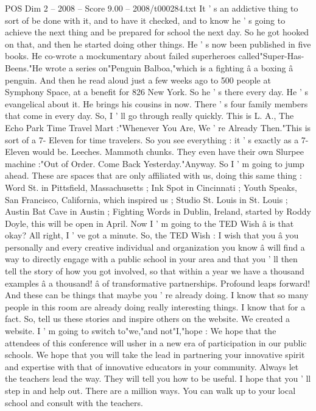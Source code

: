 \begin{textsample}{POS Dim 2 – 2008 – Score 9.00 – 2008/t000284.txt}
It ' s an addictive thing to sort of be done with it, and to have it checked, and to know he ' s going to achieve the next thing and be prepared for school the next day.
So he got hooked on that, and then he started doing other things.
He ' s now been published in five books.
He co-wrote a mockumentary about failed superheroes called"Super-Has-Beens."He wrote a series on"Penguin Balboa,"which is a fighting â a boxing â penguin.
And then he read aloud just a few weeks ago to 500 people at Symphony Space, at a benefit for 826 New York.
So he ' s there every day.
He ' s evangelical about it.
He brings his cousins in now.
There ' s four family members that come in every day.
So, I ' ll go through really quickly.
This is L.
A., The Echo Park Time Travel Mart :"Whenever You Are, We ' re Already Then."This is sort of a 7- Eleven for time travelers.
So you see everything : it ' s exactly as a 7-Eleven would be.
Leeches.
Mammoth chunks.
They even have their own Slurpee machine :"Out of Order.
Come Back Yesterday."Anyway.
So I ' m going to jump ahead.
These are spaces that are only affiliated with us, doing this same thing : Word St. in Pittsfield, Massachusetts ; Ink Spot in Cincinnati ; Youth Speaks, San Francisco, California, which inspired us ; Studio St.
Louis in St.
Louis ; Austin Bat Cave in Austin ; Fighting Words in Dublin, Ireland, started by Roddy Doyle, this will be open in April.
Now I ' m going to the TED Wish â is that okay?
All right, I ' ve got a minute.
So, the TED Wish : I wish that you â you personally and every creative individual and organization you know â will find a way to directly engage with a public school in your area and that you ' ll then tell the story of how you got involved, so that within a year we have a thousand examples â a thousand! â of transformative partnerships.
Profound leaps forward!
And these can be things that maybe you ' re already doing.
I know that so many people in this room are already doing really interesting things.
I know that for a fact.
So, tell us these stories and inspire others on the website.
We created a website.
I ' m going to switch to"we,"and not"I,"hope : We hope that the attendees of this conference will usher in a new era of participation in our public schools.
We hope that you will take the lead in partnering your innovative spirit and expertise with that of innovative educators in your community.
Always let the teachers lead the way.
They will tell you how to be useful.
I hope that you ' ll step in and help out.
There are a million ways.
You can walk up to your local school and consult with the teachers.

\end{textsample}
